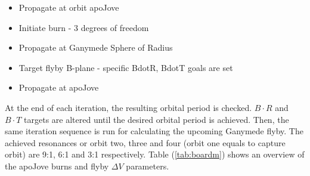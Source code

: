 \begin{itemize}
  \item Propagate at orbit apoJove
  \item Initiate burn - 3 degrees of freedom
  \item Propagate at Ganymede Sphere of Radius
  \item Target flyby B-plane - specific BdotR, BdotT goals are set
  \item Propagate at apoJove
\end{itemize}

At the end of each iteration, the resulting orbital period is checked. $B\cdot R$ and $B\cdot T$ targets are altered until the desired orbital period is achieved. Then, the same iteration sequence is run for calculating the upcoming Ganymede flyby. The achieved resonances or orbit two, three and four (orbit one equals to capture orbit) are 9:1, 6:1 and 3:1 respectively. 
Table (\ref{tab:boardm}) shows an overview of the apoJove burns and flyby $\Delta V$ parameters.

